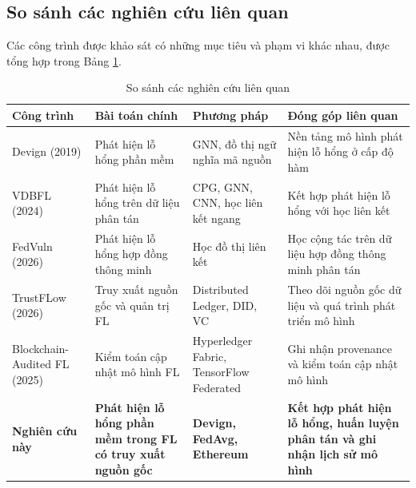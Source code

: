 \subsection{So sánh các nghiên cứu liên quan}

Các công trình được khảo sát có những mục tiêu và phạm vi khác nhau, được tổng hợp trong Bảng
\ref{tab:related-work}.

\begin{table}[htbp]
	\centering
	\caption{So sánh các nghiên cứu liên quan}
	\label{tab:related-work}
	\small
	\begin{tabularx}{\textwidth}{|l|X|X|X|}
		\hline
		\textbf{Công trình}          & \textbf{Bài toán chính}                                             & \textbf{Phương pháp}                     & \textbf{Đóng góp liên quan}                                                         \\
		\hline
		Devign (2019)                & Phát hiện lỗ hổng phần mềm                                          & GNN, đồ thị ngữ nghĩa mã nguồn           & Nền tảng mô hình phát hiện lỗ hổng ở cấp độ hàm                                     \\
		\hline
		VDBFL (2024)                 & Phát hiện lỗ hổng trên dữ liệu phân tán                             & CPG, GNN, CNN, học liên kết ngang        & Kết hợp phát hiện lỗ hổng với học liên kết                                          \\
		\hline
		FedVuln (2026)               & Phát hiện lỗ hổng hợp đồng thông minh                               & Học đồ thị liên kết                      & Học cộng tác trên dữ liệu hợp đồng thông minh phân tán                              \\
		\hline
		TrustFLow (2026)             & Truy xuất nguồn gốc và quản trị FL                                  & Distributed Ledger, DID, VC              & Theo dõi nguồn gốc dữ liệu và quá trình phát triển mô hình                          \\
		\hline
		Blockchain-Audited FL (2025) & Kiểm toán cập nhật mô hình FL                                       & Hyperledger Fabric, TensorFlow Federated & Ghi nhận provenance và kiểm toán cập nhật mô hình                                   \\
		\hline
		\textbf{Nghiên cứu này}      & \textbf{Phát hiện lỗ hổng phần mềm trong FL có truy xuất nguồn gốc} & \textbf{Devign, FedAvg, Ethereum}        & \textbf{Kết hợp phát hiện lỗ hổng, huấn luyện phân tán và ghi nhận lịch sử mô hình} \\
		\hline
	\end{tabularx}
\end{table}

